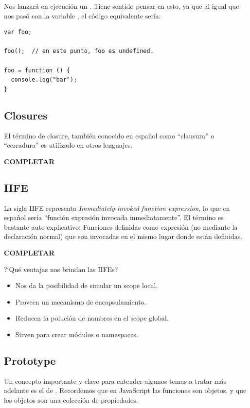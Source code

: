 Nos lanzará en ejecución un . Tiene sentido pensar en esto, ya que al igual que nos pasó con la variable , el código equivalente sería:

\begin{lstlisting}
var foo;

foo();	// en este punto, foo es undefined.

foo = function () { 
  console.log("bar");
}
\end{lstlisting}

\subsection{Closures}

El término de closure, también conocido en español como "`clausura"' o "`cerradura"' es utilizado en otros lenguajes.

\textbf{COMPLETAR}

\subsection{IIFE}

La sigla IIFE representa \textit{Immediately-invoked function expression}, lo que en español sería "`función expresión invocada inmediatamente"'. El término es bastante auto-explicativo: Funciones definidas como expresión (no mediante la declaración normal) que son invocadas en el mismo lugar donde están definidas.

\textbf{COMPLETAR}

?`Qué ventajas nos brindan las IIFEs?

\begin{itemize}
	\item Nos da la posibilidad de simular un scope local.
	\item Proveen un mecanismo de encapsulamiento.
	\item Reducen la polución de nombres en el scope global.
	\item Sirven para crear módulos o namespaces.
\end{itemize}

\subsection{Prototype}
\label{sec:prototype}

Un concepto importante y clave para entender algunos temas a tratar más adelante es el de . Recordemos que en JavaScript las funciones son objetos, y que los objetos son una colección de propiedades. 

